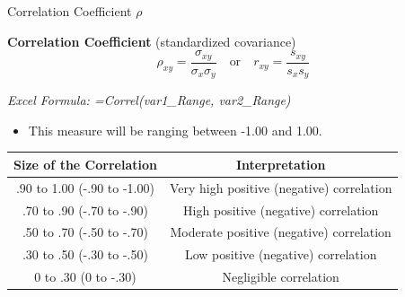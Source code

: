 \documentclass{beamer}
\begin{document}
\begin{frame}{Correlation Coefficient $\rho$}

\textbf{Correlation Coefficient} (standardized covariance)
$$\rho_{xy} = \frac{\sigma_{xy}}{\sigma_x \sigma_y} \quad\text{or}\quad r_{xy} = \frac{s_{xy}}{s_x s_y}   $$

\begin{flushright}
\textit{Excel Formula: =Correl(var1\_Range, var2\_Range)}
\end{flushright}

\begin{itemize}
\item This measure will be ranging between -1.00 and 1.00.

\end{itemize}


\begin{tabular}{c|c}
\hline 
Size of the Correlation & Interpretation \\ 
\hline 
.90 to 1.00 (-.90 to -1.00) & Very high positive (negative) correlation \\ 
\hline 
.70 to .90 (-.70 to -.90) & High positive (negative) correlation \\ 
\hline 
.50 to .70 (-.50 to -.70) & Moderate positive (negative) correlation \\ 
\hline 
.30 to .50 (-.30 to -.50) & Low positive (negative) correlation \\ 
\hline 
0 to .30 (0 to -.30) & Negligible correlation \\ 
\hline 
\end{tabular} 

 

\end{frame}
\end{document}
